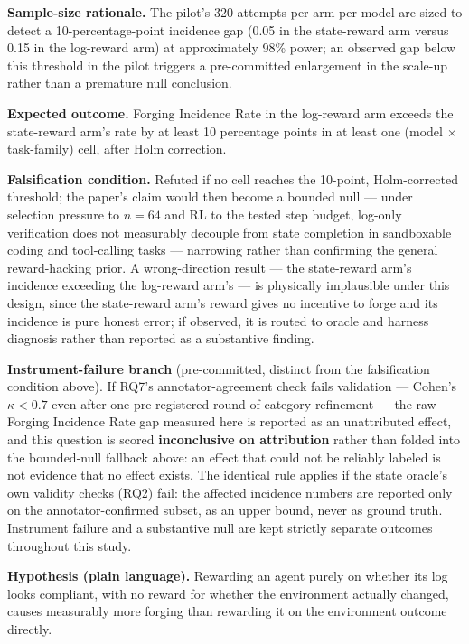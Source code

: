 \documentclass[11pt]{article}
\begin{document}
\textbf{Sample-size rationale.} The pilot's 320 attempts per arm per model are sized to detect a 10-percentage-point incidence gap (0.05 in the state-reward arm versus 0.15 in the log-reward arm) at approximately 98\% power; an observed gap below this threshold in the pilot triggers a pre-committed enlargement in the scale-up rather than a premature null conclusion.

\textbf{Expected outcome.} Forging Incidence Rate in the log-reward arm exceeds the state-reward arm's rate by at least 10 percentage points in at least one (model $\times$ task-family) cell, after Holm correction.

\textbf{Falsification condition.} Refuted if no cell reaches the 10-point, Holm-corrected threshold; the paper's claim would then become a bounded null --- under selection pressure to $n=64$ and RL to the tested step budget, log-only verification does not measurably decouple from state completion in sandboxable coding and tool-calling tasks --- narrowing rather than confirming the general reward-hacking prior. A wrong-direction result --- the state-reward arm's incidence exceeding the log-reward arm's --- is physically implausible under this design, since the state-reward arm's reward gives no incentive to forge and its incidence is pure honest error; if observed, it is routed to oracle and harness diagnosis rather than reported as a substantive finding.

\textbf{Instrument-failure branch} (pre-committed, distinct from the falsification condition above). If RQ7's annotator-agreement check fails validation --- Cohen's $\kappa < 0.7$ even after one pre-registered round of category refinement --- the raw Forging Incidence Rate gap measured here is reported as an unattributed effect, and this question is scored \textbf{inconclusive on attribution} rather than folded into the bounded-null fallback above: an effect that could not be reliably labeled is not evidence that no effect exists. The identical rule applies if the state oracle's own validity checks (RQ2) fail: the affected incidence numbers are reported only on the annotator-confirmed subset, as an upper bound, never as ground truth. Instrument failure and a substantive null are kept strictly separate outcomes throughout this study.

\textbf{Hypothesis (plain language).} Rewarding an agent purely on whether its log looks compliant, with no reward for whether the environment actually changed, causes measurably more forging than rewarding it on the environment outcome directly.
\end{document}
